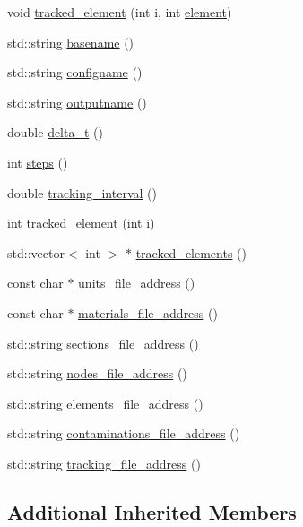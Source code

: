 \begin{DoxyCompactItemize}
\item 
void \hyperlink{classtds__run_a992893887cdbc12a5169ddb4433ed2fc}{tracked\-\_\-element} (int i, int \hyperlink{classtds_aec8ca7ac2f04016feeac7bb3f06da314}{element})
\item 
std\-::string \hyperlink{classtds__run_a137f612e6b407e454bccad95afbb21a9}{basename} ()
\item 
std\-::string \hyperlink{classtds__run_a9e8f81d142ee0b76bfd6e9e28d2b63f3}{configname} ()
\item 
std\-::string \hyperlink{classtds__run_a1d9a5d498afe05b982a0a7f748eb8210}{outputname} ()
\item 
double \hyperlink{classtds__run_a5e48a031180b7523e53378f5174d79a3}{delta\-\_\-t} ()
\item 
int \hyperlink{classtds__run_a62c2082354b12fb78a2888ab719c1ad9}{steps} ()
\item 
double \hyperlink{classtds__run_a55ac0838be1171fc81aa8c029c582074}{tracking\-\_\-interval} ()
\item 
int \hyperlink{classtds__run_a163561d49e453bae8832cea7330f2e6f}{tracked\-\_\-element} (int i)
\item 
std\-::vector$<$ int $>$ $\ast$ \hyperlink{classtds__run_aba189393afcc21e3320bef781ddbe67d}{tracked\-\_\-elements} ()
\item 
const char $\ast$ \hyperlink{classtds__run_a4d3f91ec85fde67fca2be01c65c9e055}{units\-\_\-file\-\_\-address} ()
\item 
const char $\ast$ \hyperlink{classtds__run_af89342b9231d4b99a83ff55d1ca5b969}{materials\-\_\-file\-\_\-address} ()
\item 
std\-::string \hyperlink{classtds__run_af40ce5e25f42be9e10b5477c0608f165}{sections\-\_\-file\-\_\-address} ()
\item 
std\-::string \hyperlink{classtds__run_abbf40891531e0cf9fd4c7900332fe36e}{nodes\-\_\-file\-\_\-address} ()
\item 
std\-::string \hyperlink{classtds__run_a89253a539c775d4b68c539b428127d36}{elements\-\_\-file\-\_\-address} ()
\item 
std\-::string \hyperlink{classtds__run_a8ff6cd6b421f73c0d77add4dd27e204e}{contaminations\-\_\-file\-\_\-address} ()
\item 
std\-::string \hyperlink{classtds__run_a5e46adee5b685171212fb294c282c27d}{tracking\-\_\-file\-\_\-address} ()
\end{DoxyCompactItemize}
\subsection*{Additional Inherited Members}


